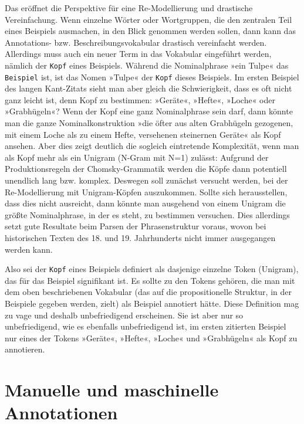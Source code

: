 \documentclass{article}
\newcommand*{\vokabular}{\texttt}%
\begin{document}
Das eröffnet die Perspektive für eine Re-Modellierung und drastische
Vereinfachung. Wenn einzelne Wörter oder Wortgruppen, die den
zentralen Teil eines Beispiels ausmachen, in den Blick genommen werden
sollen, dann kann das Annotations- bzw. Beschreibungsvokabular
drastisch vereinfacht werden. Allerdings muss auch ein neuer Term in
das Vokabular eingeführt werden, nämlich der \vokabular{Kopf} eines
Beispiels. Während die Nominalphrase »ein Tulpe« das
\vokabular{Beispiel} ist, ist das Nomen »Tulpe« der \vokabular{Kopf}
dieses Beispiels. Im ersten Beispiel des langen Kant-Zitats sieht man
aber gleich die Schwierigkeit, dass es oft nicht ganz leicht ist, denn
Kopf zu bestimmen: »Geräte«, »Hefte«, »Loche« oder »Grabhügeln«? Wenn
der Kopf eine ganz Nominalphrase sein darf, dann könnte man die ganze
Nominalkonstruktion »die öfter aus alten Grabhügeln gezogenen, mit
einem Loche als zu einem Hefte, versehenen steinernen Geräte« als Kopf
ansehen. Aber dies zeigt deutlich die sogleich eintretende
Komplexität, wenn man als Kopf mehr als ein Unigram (N-Gram mit N=1)
zulässt: Aufgrund der Produktionsregeln der Chomsky-Grammatik werden
die Köpfe dann potentiell unendlich lang bzw. komplex. Deswegen soll
zunächst versucht werden, bei der Re-Modellierung mit Unigram-Köpfen
auszukommen. Sollte sich herausstellen, dass dies nicht ausreicht,
dann könnte man ausgehend von einem Unigram die größte Nominalphrase,
in der es steht, zu bestimmen versuchen. Dies allerdings setzt gute
Resultate beim Parsen der Phrasenstruktur voraus, wovon bei
historischen Texten des 18. und 19. Jahrhunderts nicht immer
ausgegangen werden kann.

Also sei der \vokabular{Kopf} eines Beispiels definiert als dasjenige
einzelne Token (Unigram), das für das Beispiel signifikant ist. Es
sollte zu den Tokens gehören, die man mit dem oben beschriebenen
Vokabular (das auf die propositionelle Struktur, in der Beispiele
gegeben werden, zielt) als Beispiel annotiert hätte. Diese Definition
mag zu vage und deshalb unbefriedigend erscheinen. Sie ist aber nur so
unbefriedigend, wie es ebenfalls unbefriedigend ist, im ersten
zitierten Beispiel nur eines der Tokens »Geräte«, »Hefte«, »Loche« und
»Grabhügeln« als Kopf zu annotieren.


\section{Manuelle und maschinelle Annotationen}
\end{document}
